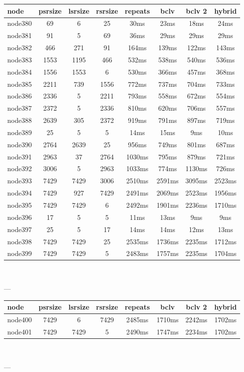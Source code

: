 \begin{tabular}{|l|c|c|c|c|c|c|c|}
\hline node & psrsize & lsrsize & rsrsize   & repeats & bclv & bclv 2 & hybrid\\
    \hline node380 & 69 & 6 & 25 & 30ms & 23ms & 18ms & 24ms\\
    \hline node381 & 91 & 5 & 69 & 36ms & 29ms & 29ms & 29ms\\
    \hline node382 & 466 & 271 & 91 & 164ms & 139ms & 122ms & 143ms\\
    \hline node383 & 1553 & 1195 & 466 & 532ms & 538ms & 540ms & 536ms\\
    \hline node384 & 1556 & 1553 & 6 & 530ms & 366ms & 457ms & 368ms\\
    \hline node385 & 2211 & 739 & 1556 & 772ms & 737ms & 704ms & 733ms\\
    \hline node386 & 2336 & 5 & 2211 & 793ms & 558ms & 672ms & 554ms\\
    \hline node387 & 2372 & 5 & 2336 & 810ms & 620ms & 706ms & 557ms\\
    \hline node388 & 2639 & 305 & 2372 & 919ms & 791ms & 897ms & 719ms\\
    \hline node389 & 25 & 5 & 5 & 14ms & 15ms & 9ms & 10ms\\
    \hline node390 & 2764 & 2639 & 25 & 956ms & 749ms & 801ms & 687ms\\
    \hline node391 & 2963 & 37 & 2764 & 1030ms & 795ms & 879ms & 721ms\\
    \hline node392 & 3006 & 5 & 2963 & 1033ms & 774ms & 1130ms & 726ms\\
    \hline node393 & 7429 & 7429 & 3006 & 2510ms & 2591ms & 3095ms & 2523ms\\
    \hline node394 & 7429 & 927 & 7429 & 2491ms & 2069ms & 2523ms & 1956ms\\
    \hline node395 & 7429 & 7429 & 6 & 2492ms & 1901ms & 2236ms & 1710ms\\
    \hline node396 & 17 & 5 & 5 & 11ms & 13ms & 9ms & 9ms\\
    \hline node397 & 25 & 5 & 17 & 14ms & 14ms & 12ms & 13ms\\
    \hline node398 & 7429 & 7429 & 25 & 2535ms & 1736ms & 2235ms & 1712ms\\
    \hline node399 & 7429 & 7429 & 5 & 2483ms & 1757ms & 2235ms & 1704ms\\

\hline
\end{tabular} \

---


\begin{tabular}{|l|c|c|c|c|c|c|c|}
\hline node & psrsize & lsrsize & rsrsize   & repeats & bclv & bclv 2 & hybrid\\
    \hline node400 & 7429 & 6 & 7429 & 2485ms & 1710ms & 2242ms & 1702ms\\
    \hline node401 & 7429 & 7429 & 5 & 2490ms & 1747ms & 2234ms & 1702ms\\

\hline
\end{tabular} \

---

